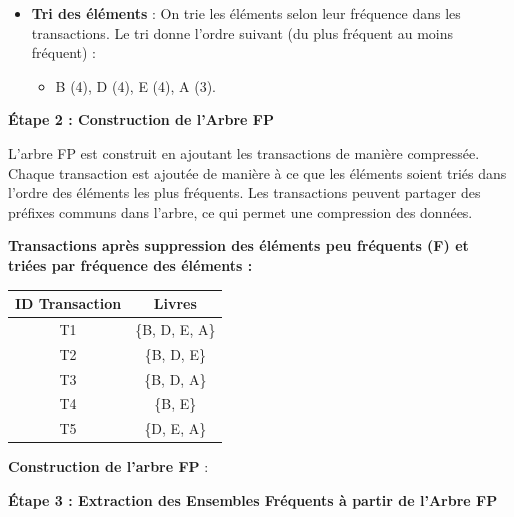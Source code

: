 \documentclass[a4paper, 12pt]{article}
\begin{document}
\begin{itemize}
    \item \textbf{Tri des éléments} : On trie les éléments selon leur fréquence dans les transactions. Le tri donne l'ordre suivant (du plus fréquent au moins fréquent) :
    \begin{itemize}
        \item B (4), D (4), E (4), A (3).
    \end{itemize}
\end{itemize}

\textbf{Étape 2 : Construction de l'Arbre FP}

L'arbre FP est construit en ajoutant les transactions de manière compressée. Chaque transaction est ajoutée de manière à ce que les éléments soient triés dans l'ordre des éléments les plus fréquents. Les transactions peuvent partager des préfixes communs dans l'arbre, ce qui permet une compression des données.

\textbf{Transactions après suppression des éléments peu fréquents (F) et triées par fréquence des éléments :}

\begin{longtable}{|c|c|}
\hline
\textbf{ID Transaction} & \textbf{Livres} \\
\hline
T1 & \{B, D, E, A\} \\
T2 & \{B, D, E\} \\
T3 & \{B, D, A\} \\
T4 & \{B, E\} \\
T5 & \{D, E, A\} \\
\hline
\end{longtable}

\textbf{Construction de l'arbre FP} :

\begin{center}
\end{center}

\textbf{Étape 3 : Extraction des Ensembles Fréquents à partir de l'Arbre FP}
\end{document}
